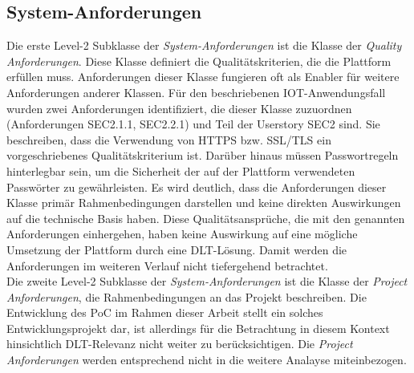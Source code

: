 \subsection{System-Anforderungen}
\label{subsec:requirements:evaluation:system}
Die erste Level-2 Subklasse der \textit{System-Anforderungen} ist die Klasse der \textit{Quality Anforderungen}. Diese Klasse definiert die Qualitätskriterien, die die Plattform erfüllen muss. Anforderungen dieser Klasse fungieren oft als Enabler für weitere Anforderungen anderer Klassen. Für den beschriebenen IOT-Anwendungsfall wurden zwei Anforderungen identifiziert, die dieser Klasse zuzuordnen (Anforderungen SEC2.1.1, SEC2.2.1) und Teil der Userstory SEC2 sind. Sie beschreiben, dass die Verwendung von HTTPS bzw. SSL/TLS ein vorgeschriebenes Qualitätskriterium ist. Darüber hinaus müssen Passwortregeln hinterlegbar sein, um die Sicherheit der auf der Plattform verwendeten Passwörter zu gewährleisten. Es wird deutlich, dass die Anforderungen dieser Klasse primär Rahmenbedingungen darstellen und keine direkten Auswirkungen auf die technische Basis haben. Diese Qualitätsansprüche, die mit den genannten Anforderungen einhergehen, haben keine Auswirkung auf eine mögliche Umsetzung der Plattform durch eine \ac{DLT}-Lösung. Damit werden die Anforderungen im weiteren Verlauf nicht tiefergehend betrachtet.\\

Die zweite Level-2 Subklasse der \textit{System-Anforderungen} ist die Klasse der \textit{Project Anforderungen}, die Rahmenbedingungen an das Projekt beschreiben. Die Entwicklung des \ac{PoC} im Rahmen dieser Arbeit stellt ein solches Entwicklungsprojekt dar, ist allerdings für die Betrachtung in diesem Kontext hinsichtlich \ac{DLT}-Relevanz nicht weiter zu berücksichtigen. Die \textit{Project Anforderungen} werden entsprechend nicht in die weitere Analayse miteinbezogen.\\

